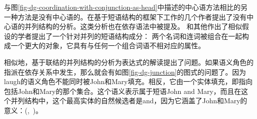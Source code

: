 与图\ref{fig-dg-coordination-with-conjunction-as-head}中描述的中心语方法相比的另一种方法是没有中心语的。在基于短语结构的框架下工作的几个作者提出了没有中心语的并列结构的分析。这类分析也在依存语法中被提及\citep{Hudson88a,Kahane97a}。 \citet{Hudson88a}和其他作出了相似假设的学者提出了一个针对并列的短语结构成分：
两个名词和连词被组合在一起构成一个更大的对象，它具有与任何一个组合词语不相对应的属性。

相似地，基于联结的并列结构的分析为表达式的解读提出了问题。如果语义角色的指派在依存关系中发生，那么就会有如图\ref{fig-dg-junction}的图式的问题了。因为laugh的语义角色不能同时被John和Mary填充。相反，它由一个实体填充，即指向包括John和Mary的那个集合。这个语义表示属于短语John and Mary，而且在这个并列结构中，这个最高实体的自然候选者是and，因为它涵盖了John和Mary的意义：(,~)。

